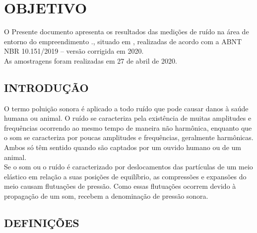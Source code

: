 \newpage
\chapter{\textbf{OBJETIVO}}

O Presente documento apresenta os resultados das medições de ruído na área de entorno do empreendimento \nomeEmpresa., situado em \cidadeSituada, realizadas de acordo com a ABNT NBR 10.151/2019 – versão corrigida em 2020. \\

As amostragens foram realizadas em 27 de abril de 2020.

\section{\textbf{INTRODUÇÃO}} 

O termo poluição sonora é aplicado a todo ruído que pode causar danos à saúde humana ou animal. O ruído se caracteriza pela existência de muitas amplitudes e frequências ocorrendo ao mesmo tempo de maneira não harmônica, enquanto que o som se caracteriza por poucas amplitudes e frequências, geralmente harmônicas. Ambos só têm sentido quando são captados por um ouvido humano ou de um animal. \\
Se o som ou o ruído é caracterizado por deslocamentos das partículas de um meio elástico em relação a suas posições de equilíbrio, as compressões e expansões do meio causam flutuações de pressão. Como essas flutuações ocorrem devido à propagação de um som, recebem a denominação de pressão sonora.

\section{\textbf{DEFINIÇÕES}}

